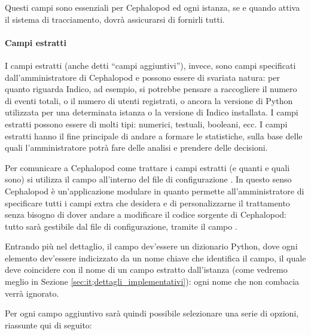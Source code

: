             Questi campi sono essenziali per Cephalopod ed ogni istanza, se e quando attiva il sistema di tracciamento, dovrà assicurarsi di fornirli tutti.
            
            \paragraph{Campi estratti}I campi estratti (anche detti ``campi aggiuntivi''), invece, sono campi specificati dall'amministratore di Cephalopod e possono essere di svariata natura: per quanto riguarda Indico, ad esempio, si potrebbe pensare a raccogliere il numero di eventi totali, o il numero di utenti registrati, o ancora la versione di Python utilizzata per una determinata istanza o la versione di Indico installata. I campi estratti possono essere di molti tipi: numerici, testuali, booleani, ecc. I campi estratti hanno il fine principale di andare a formare le statistiche, sulla base delle quali l'amministratore potrà fare delle analisi e prendere delle decisioni.
            
            Per comunicare a Cephalopod come trattare i campi estratti (e quanti e quali sono) si utilizza il campo  all'interno del file di configurazione . In questo senso Cephalopod è un'applicazione modulare in quanto permette all'amministratore di specificare tutti i campi extra che desidera e di personalizzarne il trattamento senza bisogno di dover andare a modificare il codice sorgente di Cephalopod: tutto sarà gestibile dal file di configurazione, tramite il campo .
            
            Entrando più nel dettaglio, il campo  dev'essere un dizionario Python, dove ogni elemento dev'essere indicizzato da un nome chiave che identifica il campo, il quale deve coincidere con il nome di un campo estratto dall'istanza (come vedremo meglio in Sezione \ref{sec:it;dettagli_implementativi}): ogni nome che non combacia verrà ignorato.
            
            Per ogni campo aggiuntivo sarà quindi possibile selezionare una serie di opzioni, riassunte qui di seguito:
            

